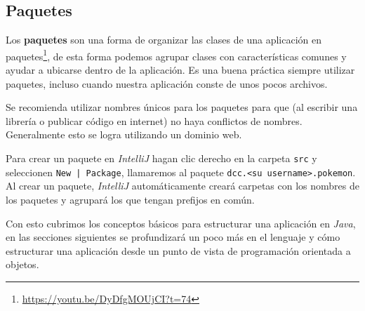 \subsection{Paquetes}
  Los \textbf{paquetes} son una forma de organizar las clases de una aplicación en 
  paquetes\footnote{\url{https://youtu.be/DyDfgMOUjCI?t=74}}, de esta forma podemos agrupar clases 
  con características comunes y ayudar a ubicarse dentro de la aplicación.
  Es una buena práctica siempre utilizar paquetes, incluso cuando nuestra aplicación conste de unos 
  pocos archivos.

  Se recomienda utilizar nombres únicos para los paquetes para que (al escribir una librería o 
  publicar código en internet) no haya conflictos de nombres.
  Generalmente esto se logra utilizando un dominio web.

  Para crear un paquete en \textit{IntelliJ} hagan clic derecho en la carpeta \texttt{src} y 
  seleccionen \texttt{New | Package}, llamaremos al paquete \texttt{dcc.<su username>.pokemon}.
  Al crear un paquete, \textit{IntelliJ} automáticamente creará carpetas con los nombres de los 
  paquetes y agrupará los que tengan prefijos en común.

  Con esto cubrimos los conceptos básicos para estructurar una aplicación en \textit{Java}, en las 
  secciones siguientes se profundizará un poco más en el lenguaje y cómo estructurar una aplicación
  desde un punto de vista de programación orientada a objetos.
%